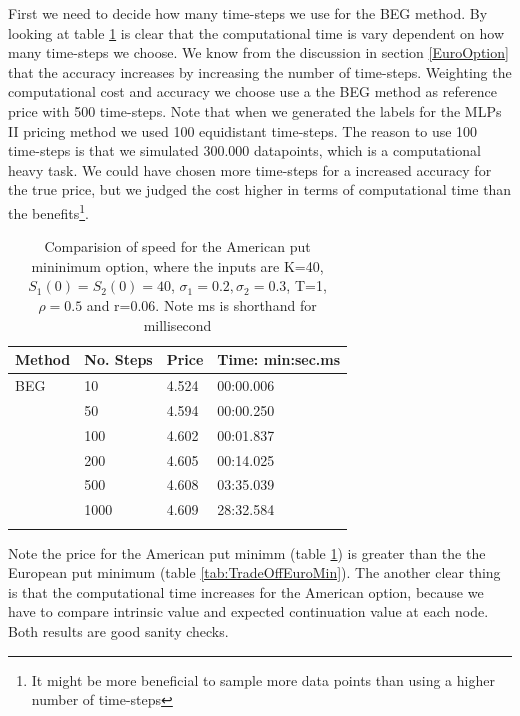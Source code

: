 First we need to decide how many time-steps we use for the BEG method. By looking at table \ref{tab:TradeOffAmerMin} is clear that the computational time is vary dependent on how many time-steps we choose. We know from the discussion in section \ref{EuroOption} that the accuracy increases by increasing the number of time-steps. Weighting the computational cost and accuracy we choose use a the BEG method as reference price with 500 time-steps. Note that when we generated the labels for the MLPs II pricing method we used 100 equidistant time-steps. The reason to use 100 time-steps is that we simulated 300.000 datapoints, which is a computational heavy task. We could have chosen more time-steps for a increased accuracy for the true price, but we judged the cost higher in terms of computational time than the benefits\footnote{It might be more beneficial to sample more data points than using a higher number of time-steps}.\\

\begin{table}[th]
\caption{Comparision of speed for the American put mininimum option, where the inputs are K=40, $S_1(0)=S_2(0)=40$, $\sigma_1=0.2, \sigma_2=0.3$, T=1, $\rho=0.5$  and r=0.06. Note ms is shorthand for millisecond}
\label{tab:TradeOffAmerMin}
\centering
\begin{tabular}{l l l l}
\toprule
\textbf{Method} & \textbf{No. Steps} & \textbf{Price} & \textbf{Time: min:sec.ms} \\
\midrule
BEG & 10 & 4.524 & 00:00.006\\
& 50 & 4.594 & 00:00.250\\
& 100 & 4.602 & 00:01.837\\
& 200 & 4.605 & 00:14.025\\
& 500 & 4.608 & 03:35.039\\
& 1000 & 4.609 & 28:32.584\\
\bottomrule\\
\end{tabular}
\end{table}

Note the price for the American put minimm (table \ref{tab:TradeOffAmerMin}) is greater than the the European put minimum (table \ref{tab:TradeOffEuroMin}). The another clear thing is that the computational time increases for the American option, because we have to compare intrinsic value and expected continuation value at each node. Both results are good sanity checks.\\

